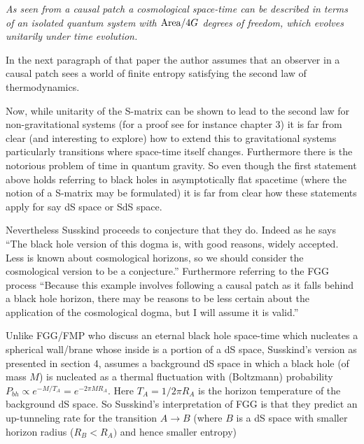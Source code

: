 \documentclass[a4paper,11pt]{article}
\numberwithin{equation}{section}
\newcommand{\citep}{\cite}
\numberwithin{equation}{section}
\begin{document}
\textit{As seen from a causal patch a cosmological space-time can
be described in terms of an isolated quantum system with $\text{{\rm Area}}/4G$
degrees of freedom, which evolves unitarily under time evolution.}

In the next paragraph of that paper the author  assumes that an observer in a causal patch sees a world of finite
entropy satisfying the second law of thermodynamics.

Now, while unitarity of the S-matrix can be shown to lead to the second
law for non-gravitational systems (for a proof see for instance \citep{Weinberg:1995mt}
chapter 3) it is far from clear (and interesting to explore) how to extend this to gravitational
systems particularly transitions where space-time itself changes.
Furthermore there is the notorious problem of time in quantum gravity.
So even though the first statement above holds referring to black holes
in asymptotically flat spacetime (where the notion of a S-matrix may be
formulated) it is far from clear how these statements apply for say
dS space or SdS space. 

Nevertheless Susskind proceeds to conjecture
that they do. Indeed as he says ``The black hole version of this
dogma is, with good reasons, widely accepted. Less is known about
cosmological horizons, so we should consider the cosmological version
to be a conjecture.'' Furthermore referring to the FGG process ``Because
this example involves following a causal patch as it falls behind
a black hole horizon, there may be reasons to be less certain about
the application of the cosmological dogma, but I will assume it is
valid.''

Unlike FGG/FMP who discuss an eternal black hole space-time which
nucleates a spherical wall/brane whose inside is a portion of a dS
space, Susskind's version as presented in section 4, assumes a background
dS space in which a black hole (of mass $M$) is nucleated as a thermal
fluctuation with (Boltzmann) probability $P_{bh}\propto e^{-M/T_{A}}=e^{-2\pi MR_{A}}.$
Here $T_{A}=1/2\pi R_{A}$ is the horizon temperature of the background
dS space. So Susskind's interpretation of FGG is that they predict
an up-tunneling rate for the transition $A\rightarrow B$ (where $B$
is a dS space with smaller horizon radius ($R_{B}<R_{A})$ and hence
smaller entropy) 
\end{document}
